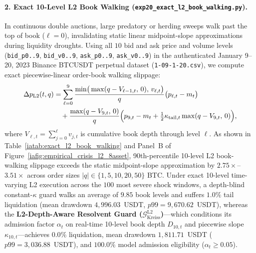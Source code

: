\documentclass[12pt]{article}
\theoremstyle{definition}
\theoremstyle{remark}
\begin{document}
\paragraph{2. Exact 10-Level L2 Book Walking (\nolinkurl{exp20_exact_l2_book_walking.py}).}
In continuous double auctions, large predatory or herding sweeps walk past the top of book ($\ell = 0$), invalidating static linear midpoint-slope approximations during liquidity droughts. Using all $10$ bid and ask price and volume levels (\texttt{bid\_p0..9}, \texttt{bid\_v0..9}, \texttt{ask\_p0..9}, \texttt{ask\_v0..9}) in the authenticated January 9--20, 2023 Binance BTCUSDT perpetual dataset (\texttt{1-09-1-20.csv}), we compute exact piecewise-linear order-book walking slippage:
\begin{equation}
\begin{aligned}
\Delta p_{\mathrm{L2}}(t, q) &= \sum_{\ell=0}^{9} \frac{\min\!\big(\max(q - V_{\ell-1,t},\,0),\, v_{\ell,t}\big)}{q}\bigl(p_{\ell,t} - m_t\bigr) \\
&\quad + \frac{\max(q - V_{9,t},\,0)}{q}\Bigl(p_{9,t} - m_t + \tfrac{1}{2}\kappa_{\mathrm{tail},t}\max(q - V_{9,t},\,0)\Bigr),
\end{aligned}
\label{eq:ia_l2_book_walking}
\end{equation}
where $V_{\ell,t} = \sum_{j=0}^\ell v_{j,t}$ is cumulative book depth through level $\ell$. As shown in Table~\ref{iatab:exact_l2_book_walking} and Panel~B of Figure~\ref{iafig:empirical_crisis_l2_8asset}, 90th-percentile 10-level L2 book-walking slippage exceeds the static midpoint-slope approximation by $2.75\times$--$3.51\times$ across order sizes $|q| \in \{1, 5, 10, 20, 50\}$ BTC. Under exact 10-level time-varying L2 execution across the $100$ most severe shock windows, a depth-blind constant-$\kappa$ guard walks an average of $9.85$ book levels and suffers $1.0\%$ tail liquidation (mean drawdown $4{,}996.03$~USDT, $p99 = 9{,}670.62$~USDT), whereas the \textbf{L2-Depth-Aware Resolvent Guard ($\mathcal{G}_{\mathrm{Kreiss}}^{\mathrm{L2}}$)}---which conditions its admission factor $\alpha_t$ on real-time 10-level book depth $D_{10,t}$ and piecewise slope $\kappa_{10,t}$---achieves $0.0\%$ liquidation, mean drawdown $1{,}811.71$~USDT ($p99 = 3{,}036.88$~USDT), and $100.0\%$ model admission eligibility ($\alpha_t \ge 0.05$).


\end{document}
